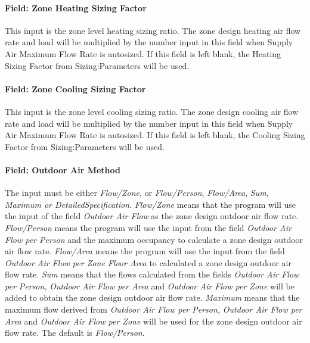\paragraph{Field: Zone Heating Sizing Factor}\label{field-zone-heating-sizing-factor-1}

This input is the zone level heating sizing ratio. The zone design heating air flow rate and load will be multiplied by the number input in this field when Supply Air Maximum Flow Rate is autosized. If this field is left blank, the Heating Sizing Factor from Sizing:Parameters will be used.

\paragraph{Field: Zone Cooling Sizing Factor}\label{field-zone-cooling-sizing-factor-000}

This input is the zone level cooling sizing ratio. The zone design cooling air flow rate and load will be multiplied by the number input in this field when Supply Air Maximum Flow Rate is autosized. If this field is left blank, the Cooling Sizing Factor from Sizing:Parameters will be used.

\paragraph{Field: Outdoor Air Method}\label{field-outdoor-air-method-2}

The input must be either \emph{Flow/Zone}, or \emph{Flow/Person}, \emph{Flow/Area}, \emph{Sum}, \emph{Maximum or DetailedSpecification}. \emph{Flow/Zone} means that the program will use the input of the field \emph{Outdoor Air Flow} as the zone design outdoor air flow rate. \emph{Flow/Person} means the program will use the input from the field \emph{Outdoor Air Flow per Person} and the maximum occupancy to calculate a zone design outdoor air flow rate. \emph{Flow/Area} means the program will use the input from the field \emph{Outdoor Air Flow per Zone Floor Area} to calculated a zone design outdoor air flow rate. \emph{Sum} means that the flows calculated from the fields \emph{Outdoor Air Flow per Person,} \emph{Outdoor Air Flow per Area} and \emph{Outdoor Air Flow per Zone} will be added to obtain the zone design outdoor air flow rate. \emph{Maximum} means that the maximum flow derived from \emph{Outdoor Air Flow per Person,} \emph{Outdoor Air Flow per Area} and \emph{Outdoor Air Flow per Zone} will be used for the zone design outdoor air flow rate. The default is \emph{Flow/Person}.


